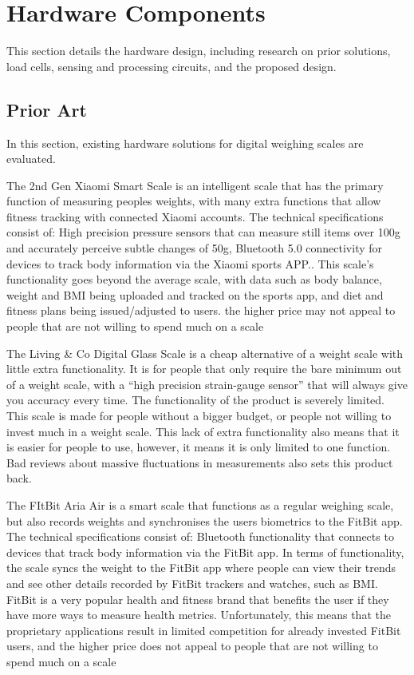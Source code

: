 
\chapter{Hardware Components}

This section details the hardware design, including research on prior solutions, load cells, sensing and processing circuits, and the proposed design.

\section{Prior Art}

In this section, existing hardware solutions for digital weighing scales are evaluated. 

The 2nd Gen Xiaomi Smart Scale is an intelligent scale that has the primary function of measuring peoples weights, with many extra functions that allow fitness tracking with connected Xiaomi accounts. The technical specifications consist of: High precision pressure sensors that can measure still items over 100g and accurately perceive subtle changes of 50g, Bluetooth 5.0 connectivity for devices to track body information via the Xiaomi sports APP.. This scale’s functionality goes beyond the average scale, with data such as body balance, weight and BMI being uploaded and tracked on the sports app, and diet and fitness plans being issued/adjusted to users. the higher price may not appeal to people that are not willing to spend much on a scale

The Living \& Co Digital Glass Scale is a cheap alternative of a weight scale with little extra functionality. It is for people that only require the bare minimum out of a weight scale, with a “high precision strain-gauge sensor” that will always give you accuracy every time. The functionality of the product is severely limited. This scale is made for people without a bigger budget, or people not willing to invest much in a weight scale. This lack of extra functionality also means that it is easier for people to use, however, it means it is only limited to one function. Bad reviews about massive fluctuations in measurements also sets this product back.

The FItBit Aria Air is a smart scale that functions as a regular weighing scale, but also records weights and synchronises the users biometrics to the FitBit app. The technical specifications consist of: Bluetooth functionality that connects to devices that track body information via the FitBit app. In terms of functionality, the scale syncs the weight to the FitBit app where people can view their trends and see other details recorded by FitBit trackers and watches, such as BMI. FitBit is a very popular health and fitness brand that benefits the user if they have more ways to measure health metrics. Unfortunately, this means that the proprietary applications result in limited competition for already invested FitBit users, and the higher price does not appeal to people that are not willing to spend much on a scale

